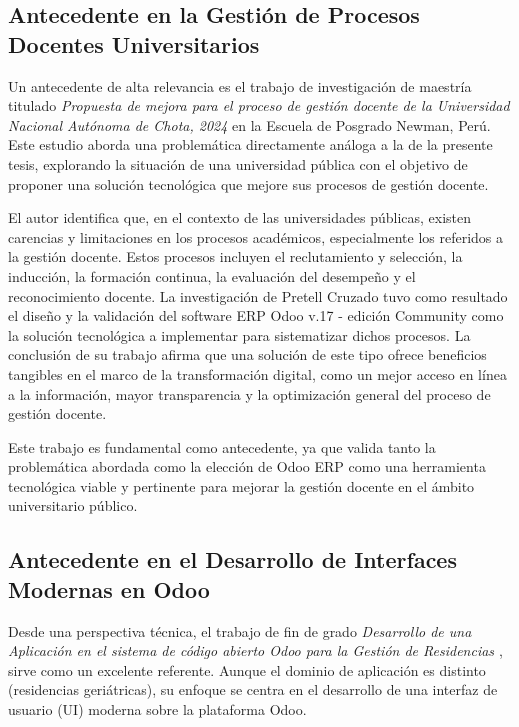 \documentclass[12pt,letterpaper,spanish]{report}
\begin{document}
\subsection{Antecedente en la Gestión de Procesos Docentes Universitarios}
\label{sub:antecedente_gestion_docente}

Un antecedente de alta relevancia es el trabajo de investigación de maestría titulado \textit{Propuesta de mejora para el proceso de gestión docente de la 
Universidad Nacional Autónoma de Chota, 2024} \citep{pretell2024mejora} en la Escuela de Posgrado Newman, Perú. Este estudio aborda una problemática directamente análoga a la de la presente tesis, explorando la situación de una universidad pública con el objetivo de proponer una solución tecnológica que mejore sus procesos de gestión docente.

El autor identifica que, en el contexto de las universidades públicas, existen carencias y limitaciones en los procesos académicos, especialmente los referidos a la gestión docente. Estos procesos incluyen el reclutamiento y selección, la inducción, la formación continua, la evaluación del desempeño y el reconocimiento docente. La investigación de Pretell Cruzado tuvo como resultado el diseño y la validación del software ERP Odoo v.17 - edición Community como la solución tecnológica a implementar para sistematizar dichos procesos. La conclusión de su trabajo afirma que una solución de este tipo ofrece beneficios tangibles en el marco de la transformación digital, como un mejor acceso en línea a la información, mayor transparencia y la optimización general del proceso de gestión docente.

Este trabajo es fundamental como antecedente, ya que valida tanto la problemática abordada como la elección de Odoo ERP como una herramienta tecnológica viable y pertinente para mejorar la gestión docente en el ámbito universitario público.

\subsection{Antecedente en el Desarrollo de Interfaces Modernas en Odoo}
\label{sub:antecedente_desarrollo_tecnico}

Desde una perspectiva técnica, el trabajo de fin de grado  \textit{Desarrollo de una Aplicación en el sistema de código abierto Odoo para la Gestión de Residencias \citep{TortCarrillo2024}}, sirve como un excelente referente. Aunque el dominio de aplicación es distinto (residencias geriátricas), su enfoque se centra en el desarrollo de una interfaz de usuario (UI) moderna sobre la plataforma Odoo.
\end{document}
